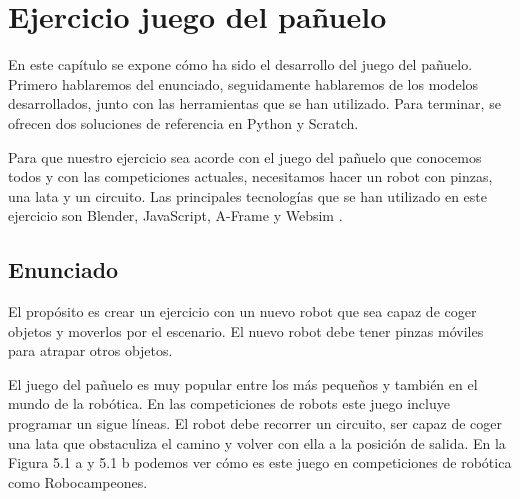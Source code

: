 \chapter{Ejercicio juego del pañuelo} \label{gripper}
En este capítulo se expone cómo ha sido el desarrollo del juego del pañuelo. Primero hablaremos del enunciado, seguidamente hablaremos de los modelos desarrollados, junto con las herramientas que se han utilizado. Para terminar, se ofrecen dos soluciones de referencia en Python y Scratch.

Para que nuestro ejercicio sea acorde con el juego del pañuelo que conocemos todos y con las competiciones actuales, necesitamos hacer un robot con pinzas, una lata  y un circuito. Las principales tecnologías que se han utilizado en este ejercicio son Blender, JavaScript, A-Frame y Websim .


\section{Enunciado}
El propósito es crear un ejercicio con un nuevo robot que sea capaz de coger objetos y moverlos por el escenario. El nuevo robot debe tener pinzas móviles para atrapar otros objetos. 

El juego del pañuelo es muy popular entre los más pequeños y también en el mundo de la robótica. En las competiciones de robots este juego incluye programar un sigue líneas. El robot debe recorrer un circuito, ser capaz de coger una lata que obstaculiza el camino y volver con ella a la posición de salida. En la Figura 5.1 a y 5.1 b podemos ver cómo es este juego en competiciones de robótica como Robocampeones.

